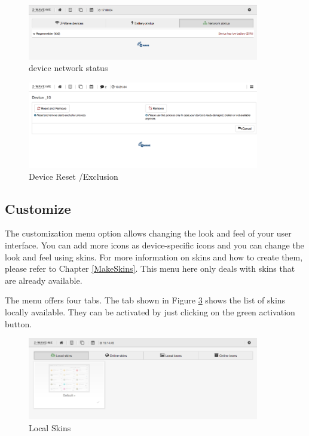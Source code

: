 \begin{figure}
\begin{center}
\includegraphics[width=0.9\textwidth]{pngs/cap4/incl8.png}
\caption{\zwave device network status}
\label{incl8}
\end{center}
\end{figure}

\begin{figure}
\begin{center}
\includegraphics[width=0.9\textwidth]{pngs/cap4/devicereset.png}
\caption{\zwave Device Reset /Exclusion}
\label{incldr}
\end{center}
\end{figure}

\subsection{Customize}
\label{customize}


The customization menu option allows changing the look and feel of your \zway user 
interface. You can add more icons as device-specific icons and you can change the look 
and feel using skins. For more information on skins and how to create them, please refer 
to Chapter \ref{MakeSkins}. This menu here only deals with skins that are already available.

The menu offers four tabs. The tab shown in Figure \ref{shui81} shows the list of skins 
locally available. They can be activated by just clicking on the green activation button.

\begin{figure}
\begin{center}
\includegraphics[width=0.9\textwidth]{pngs/cap4/shui81.png}
\caption{Local Skins}
\label{shui81}
\end{center}
\end{figure}

